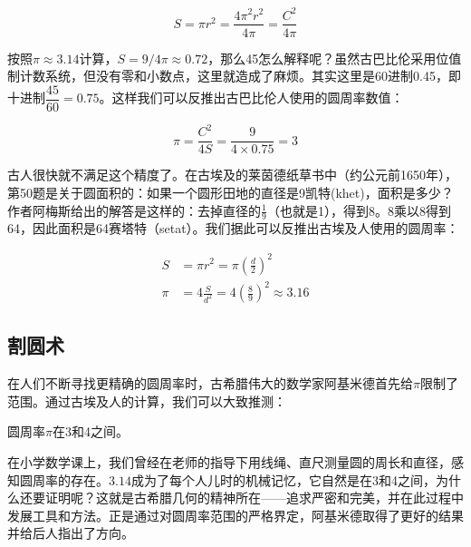 \documentclass[b5paper]{ctexart}
\begin{document}
\[
S = \pi r^2 = \frac{4 \pi^2 r^2}{4\pi} = \frac{C^2}{4\pi}
\]

按照$\pi \approx 3.14$计算，$S = 9/4\pi \approx 0.72$，那么45怎么解释呢？虽然古巴比伦采用位值制计数系统，但没有零和小数点，这里就造成了麻烦。其实这里是60进制0.45，即十进制$\dfrac{45}{60} = 0.75$。这样我们可以反推出古巴比伦人使用的圆周率数值：

\[
\pi = \frac{C^2}{4S} = \frac{9}{4 \times 0.75} = 3
\]

古人很快就不满足这个精度了。在古埃及的莱茵德纸草书中（约公元前1650年），第50题是关于圆面积的：如果一个圆形田地的直径是9凯特(khet)，面积是多少？作者阿梅斯给出的解答是这样的：去掉直径的$\frac{1}{9}$（也就是1），得到8。8乘以8得到64，因此面积是64赛塔特（setat）。我们据此可以反推出古埃及人使用的圆周率：

\begin{align*}
S & = \pi r^2 = \pi (\frac{d}{2})^2 \\
\pi & = 4\frac{S}{d^2} = 4(\frac{8}{9})^2 \approx 3.16
\end{align*}

\subsection{割圆术}
在人们不断寻找更精确的圆周率时，古希腊伟大的数学家阿基米德首先给$\pi$限制了范围。通过古埃及人的计算，我们可以大致推测：

\begin{proposition}
圆周率$\pi$在3和4之间。
\end{proposition}

在小学数学课上，我们曾经在老师的指导下用线绳、直尺测量圆的周长和直径，感知圆周率的存在。$3.14$成为了每个人儿时的机械记忆，它自然是在3和4之间，为什么还要证明呢？这就是古希腊几何的精神所在——追求严密和完美，并在此过程中发展工具和方法。正是通过对圆周率范围的严格界定，阿基米德取得了更好的结果并给后人指出了方向。
\end{document}
